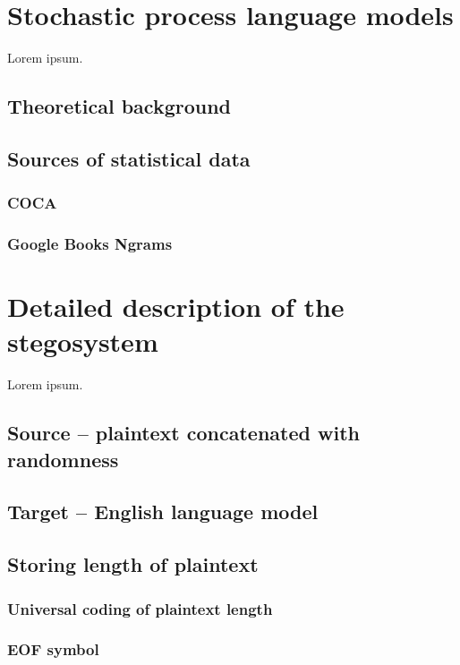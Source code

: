 \documentclass{IIBproject}
\begin{document}
\section{Stochastic process language models}

Lorem ipsum.

\subsection{Theoretical background}

\subsection{Sources of statistical data}

\subsubsection{COCA}

\subsubsection{Google Books Ngrams}

\section{Detailed description of the stegosystem}

Lorem ipsum.

\subsection{Source -- plaintext concatenated with randomness}

\subsection{Target -- English language model}

\subsection{Storing length of plaintext}

\subsubsection{Universal coding of plaintext length}

\subsubsection{EOF symbol}
\end{document}
